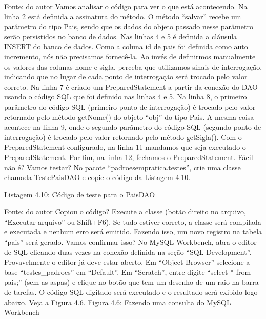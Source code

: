 Fonte: do autor
Vamos analisar o código para ver o que está acontecendo. Na linha 2 está definida a assinatura do método. O método “salvar” recebe um parâmetro do tipo Pais, sendo que os dados do objeto passado nesse parâmetro serão persistidos no banco de dados. Nas linhas 4 e 5 é definida a cláusula INSERT do banco de dados. Como a coluna id de pais foi definida como auto incremento, nós não precisamos fornecê-la. Ao invés de definirmos manualmente os valores das colunas nome e sigla, perceba que utilizamos sinais de interrogação, indicando que no lugar de cada ponto de interrogação será trocado pelo valor correto. Na linha 7 é criado um PreparedStatement a partir da conexão do DAO usando o código SQL que foi definido nas linhas 4 e 5. Na linha 8, o primeiro parâmetro do código SQL (primeiro ponto de interrogação) é trocado pelo valor retornado pelo método getNome() do objeto “obj” do tipo Pais. A mesma coisa acontece na linha 9, onde o segundo parâmetro do código SQL (segundo ponto de interrogação) é trocado pelo valor retornado pelo método getSigla(). Com o PreparedStatement configurado, na linha 11 mandamos que seja executado o PreparedStatement. Por fim, na linha 12, fechamos o PreparedStatement. Fácil não é?
Vamos testar? No pacote “padroesempratica.testes”, crie uma classe chamada TestePaisDAO e copie o código da Listagem 4.10.






Listagem 4.10: Código de teste para o PaisDAO
 
Fonte: do autor
Copiou o código? Execute a classe (botão direito no arquivo, “Executar arquivo” ou Shift+F6). Se tudo estiver correto, a classe será compilada e executada e nenhum erro será emitido. Fazendo isso, um novo registro na tabela “pais” será gerado. Vamos confirmar isso? No MySQL Workbench, abra o editor de SQL clicando duas vezes na conexão definida na seção “SQL Development”. Provavelmente o editor já deve estar aberto. Em “Object Browser” selecione a base “testes\_padroes” em “Default”. Em “Scratch”, entre digite “select * from pais;” (sem as aspas) e clique no botão que tem um desenho de um raio na barra de tarefas. O código SQL digitado será executado e o resultado será exibido logo abaixo. Veja a Figura 4.6.
Figura 4.6: Fazendo uma consulta do MySQL Workbench
 
